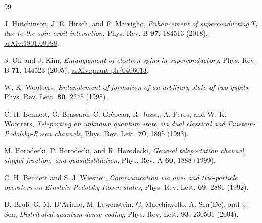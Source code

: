 \documentclass[11pt]{article}
\begin{document}
\begin{thebibliography}{99}

J. Hutchinson, J. E. Hirsch, and F. Marsiglio,
\emph{Enhancement of superconducting $T_c$ due to the spin-orbit interaction},
Phys. Rev. B \textbf{97}, 184513 (2018),
\href{https://arxiv.org/html/1801.08988}{arXiv:1801.08988}.

S. Oh and J. Kim,
\emph{Entanglement of electron spins in superconductors},
Phys. Rev. B \textbf{71}, 144523 (2005),
\href{https://arxiv.org/pdf/quant-ph/0406013}{arXiv:quant-ph/0406013}.

W. K. Wootters,
\emph{Entanglement of formation of an arbitrary state of two qubits},
Phys. Rev. Lett. \textbf{80}, 2245 (1998).

C. H. Bennett, G. Brassard, C. Cr\'epeau, R. Jozsa, A. Peres, and W. K. Wootters,
\emph{Teleporting an unknown quantum state via dual classical and Einstein-Podolsky-Rosen channels},
Phys. Rev. Lett. \textbf{70}, 1895 (1993).

M. Horodecki, P. Horodecki, and R. Horodecki,
\emph{General teleportation channel, singlet fraction, and quasidistillation},
Phys. Rev. A \textbf{60}, 1888 (1999).

C. H. Bennett and S. J. Wiesner,
\emph{Communication via one- and two-particle operators on Einstein-Podolsky-Rosen states},
Phys. Rev. Lett. \textbf{69}, 2881 (1992).

D. Bru\ss, G. M. D'Ariano, M. Lewenstein, C. Macchiavello, A. Sen(De), and U. Sen,
\emph{Distributed quantum dense coding},
Phys. Rev. Lett. \textbf{93}, 230501 (2004).

\end{thebibliography}
\end{document}
